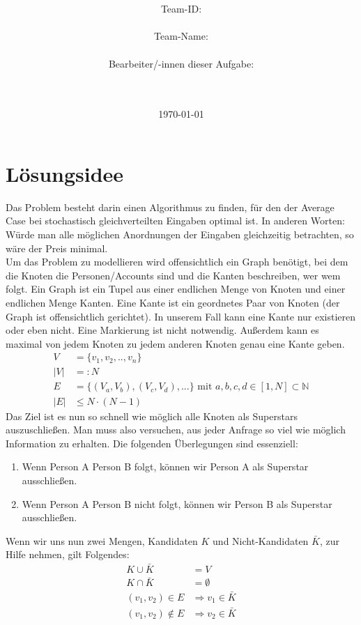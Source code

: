 \documentclass[a4paper,10pt,ngerman]{scrartcl}
\title{\textbf{\Huge\Aufgabe}}
\author{\LARGE Team-ID: \LARGE \TeamID \\\\
	    \LARGE Team-Name: \LARGE \TeamName \\\\
	    \LARGE Bearbeiter/-innen dieser Aufgabe: \\ 
	    \LARGE \Namen\\\\}
\date{\LARGE\today}
\begin{document}
\maketitle
\tableofcontents

\vspace{0.5cm}

\section{Lösungsidee}
Das Problem besteht darin einen Algorithmus zu finden, f\"ur den der Average Case bei stochastisch
gleichverteilten Eingaben optimal ist. In anderen Worten: W\"urde man alle m\"oglichen Anordnungen der
Eingaben gleichzeitig betrachten, so w\"are der Preis minimal.\\
\indent Um das Problem zu modellieren wird offensichtlich ein Graph ben\"otigt, bei dem die
Knoten die Personen/Accounts sind und die Kanten beschreiben, wer wem folgt. Ein Graph ist ein
Tupel aus einer endlichen Menge von Knoten und einer endlichen Menge Kanten. Eine Kante ist ein
geordnetes Paar von Knoten (der Graph ist offensichtlich gerichtet). In unserem Fall kann eine Kante
nur existieren oder eben nicht. Eine Markierung ist nicht notwendig. Au\ss erdem kann es maximal
von jedem Knoten zu jedem anderen Knoten genau eine Kante geben. 
\begin{align}
  V &= \{v_1, v_2, .., v_n\} \\
  |V| &=: N\\
  E &= \{(V_a, V_b), (V_c, V_d), ...\} \text{ mit } a,b,c,d \in [1, N] \subset \mathbb{N}\\
  |E| &\leq N\cdot(N-1)
\end{align}
Das Ziel ist es nun so schnell wie m\"oglich alle Knoten als Superstars
auszuschlie\ss en. Man muss also versuchen, aus jeder Anfrage so viel wie m\"oglich
Information zu erhalten. Die folgenden \"Uberlegungen sind essenziell:
\begin{enumerate}
  \item Wenn Person A Person B folgt, k\"onnen wir Person A als Superstar
        ausschlie\ss en.
  \item Wenn Person A Person B nicht folgt, k\"onnen wir Person B als Superstar
        ausschlie\ss en.
\end{enumerate}  
Wenn wir uns nun zwei Mengen, Kandidaten $K$ und Nicht-Kandidaten $\bar{K}$, zur Hilfe nehmen, gilt Folgendes:
\begin{align}
  K \cup \bar{K} &= V\\
  K \cap \bar{K} &= \emptyset\\
  (v_1, v_2)\in E &\Rightarrow v_1 \in \bar{K}\\
  (v_1, v_2)\notin E &\Rightarrow v_2 \in \bar{K}
\end{align}
\end{document}
